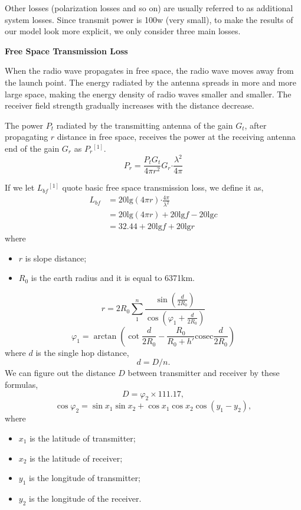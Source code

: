 \documentclass{mcmthesis}
\begin{document}
Other losses (polarization losses and so on) are usually referred to as additional system losses. Since transmit power is 100w (very small), to make the results of our model look more explicit, we only consider three main losses.

\textbf{Free Space Transmission Loss}

When the radio wave propagates in free space, the radio wave moves away from the launch point. The energy radiated by the antenna spreads in more and more large space, making the energy density of radio waves smaller and smaller. The receiver field strength gradually increases with the distance decrease.

The power $P_t$ radiated by the transmitting antenna of the gain $G_t$, after propagating $r$ distance in free space, receives the power at the receiving antenna end of the gain $G_r$ as $P_r$$^{[1]}$. 
\begin{equation}
P_r = \displaystyle\frac{P_tG_t}{4\pi r^2}G_r
\bm\cdot \frac{\lambda^2}{4\pi}
\end{equation}

If we let $L_{bf}$$^{[1]}$ quote basic free space transmission loss, we define it as,
\begin{align}
L_{bf} &= 20\mathrm{lg}(4\pi r)\bm\cdot \frac{4\pi}{\lambda^2}\nonumber\\
&=20\mathrm{lg}(4\pi r)+20\mathrm{lg} f-20\mathrm{lg} c\nonumber\\
&=32.44+20\mathrm{lg}f + 20\mathrm{lg}r
\end{align}
where \begin{itemize}
\item $r$ is slope distance; 
\item $R_0$ is the earth radius and it is equal to 6371km.
\end{itemize}
\begin{equation}
r = 2R_0\displaystyle\sum\limits_{1}^n\frac{\sin(\displaystyle\frac{d}{2R_0})}{\cos\left( \varphi_1+\displaystyle\frac{d}{2R_0} \right)}
\end{equation}
\begin{equation}
\varphi_1 = \arctan(\cot\frac{d}{2R_0}-
\frac{R_0}{R_0+h'}\mathrm{cosec}\frac{d}{2R_0})
\end{equation}
where $d$ is the single hop distance,
\begin{equation}
d = D/n.
\end{equation}
We can figure out the distance $D$ between transmitter and receiver by these formulas,
\begin{equation}
D = \varphi_2\times 111.17,
\end{equation}
\begin{equation}
\cos\varphi_2 = \sin x_1\sin x_2+\cos x_1\cos x_2\cos(y_1-y_2),
\end{equation}
where \begin{itemize}
\item $x_1$ is the latitude of transmitter;
\item $x_2$ is the latitude of receiver;
\item $y_1$ is the longitude of transmitter;
\item $y_2$ is the longitude of the receiver.
\end{itemize}
\end{document}
